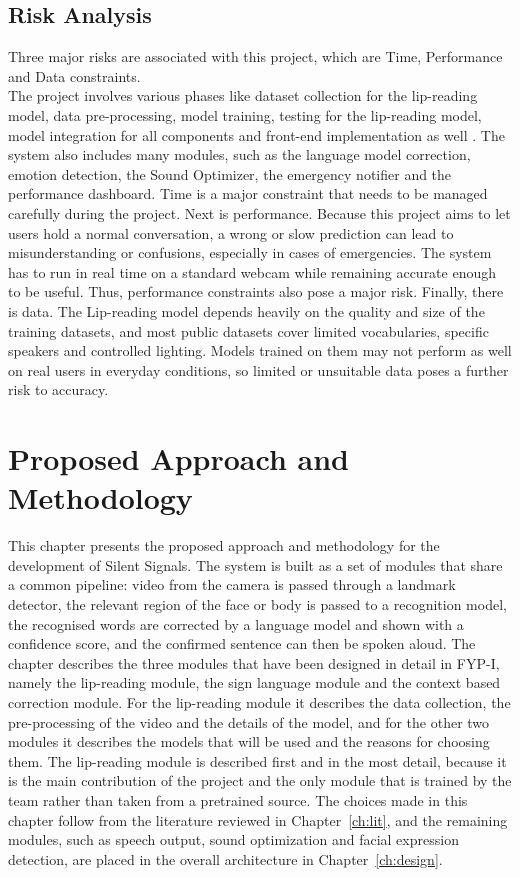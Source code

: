 \documentclass{FastFyp}
\begin{document}
\section{ Risk Analysis}
Three major risks are associated with this project, which are Time, Performance and Data constraints.\\
The project involves various phases like dataset collection for the lip-reading model, data pre-processing, model training, testing for the lip-reading model, model integration for all components and front-end implementation as well . The system also includes many modules, such as the language model correction, emotion detection, the Sound Optimizer, the emergency notifier and the performance dashboard. 
Time is a major constraint that needs to be managed carefully during the project.
Next is performance. Because this project aims to let users hold a normal conversation, a wrong or slow prediction can lead to misunderstanding or confusions, especially in cases of emergencies. 
The system has to run in real time on a standard webcam while remaining accurate enough to be useful. 
Thus, performance constraints also pose a major risk.
Finally, there is data. 
The Lip-reading model depends heavily on the quality and size of the training datasets, 
and most public datasets cover limited vocabularies, specific speakers and controlled lighting. 
Models trained on them may not perform as well on real users in everyday conditions, so limited or unsuitable data poses a further risk to accuracy.

\chapter{Proposed Approach and Methodology}
\label{ch:approach}
This chapter presents the proposed approach and methodology for the development of Silent Signals. The system is built as a set of modules that share a common pipeline: video from the camera is passed through a landmark detector, the relevant region of the face or body is passed to a recognition model, the recognised words are corrected by a language model and shown with a confidence score, and the confirmed sentence can then be spoken aloud. The chapter describes the three modules that have been designed in detail in FYP-I, namely the lip-reading module, the sign language module and the context based correction module. For the lip-reading module it describes the data collection, the pre-processing of the video and the details of the model, and for the other two modules it describes the models that will be used and the reasons for choosing them. The lip-reading module is described first and in the most detail, because it is the main contribution of the project and the only module that is trained by the team rather than taken from a pretrained source. The choices made in this chapter follow from the literature reviewed in Chapter~\ref{ch:lit}, and the remaining modules, such as speech output, sound optimization and facial expression detection, are placed in the overall architecture in Chapter~\ref{ch:design}.
\end{document}
